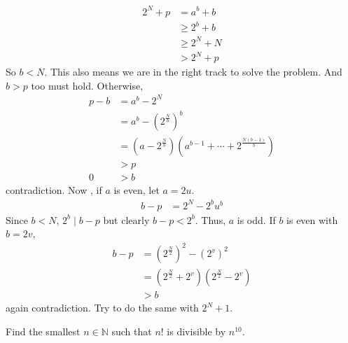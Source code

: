 \documentclass[problems.tex]{subfile}
\begin{document}
\begin{solution}
			\begin{align*}
				2^N+p & = a^b+b\\
					  &\geq2^b+b\\
					  &\geq2^N+N\\
					  & > 2^N+p
			\end{align*}
		So $b<N$. This also means we are in the right track to solve the problem. And $b>p$ too must hold. Otherwise,
			\begin{align*}
				p-b & = a^b-2^N\\
					& = a^b-\left(2^{\frac{N}{b}}\right)^b\\
					& = \left(a-2^{\frac{N}{b}}\right)\left(a^{b-1}+\cdots+2^{\frac{N(b-1)}{b}}\right)\\
					& > p\\
				0	& > b
			\end{align*}
		contradiction.  Now , if $a$ is even, let $a=2u$.
			\begin{align*}
				b-p & = 2^N-2^bu^b
			\end{align*}
		Since $b<N$, $2^b\mid b-p$ but clearly $b-p<2^b$. Thus, $a$ is odd. If $b$ is even with $b=2v$,
			\begin{align*}
				b-p & = \left(2^{\frac{N}{2}}\right)^2-\left(2^v\right)^2\\
					& = \left(2^{\frac{N}{2}}+2^v\right)\left(2^{\frac{N}{2}}-2^v\right)\\
					& > b
			\end{align*}
		again contradiction. Try to do the same with $2^N+1$.
	\end{solution}

	\begin{problem}[Columbia $2010$]
		Find the smallest $n\in\mathbb{N}$ such that $n!$ is divisible by $n^{10}$.
	\end{problem}
\end{document}
